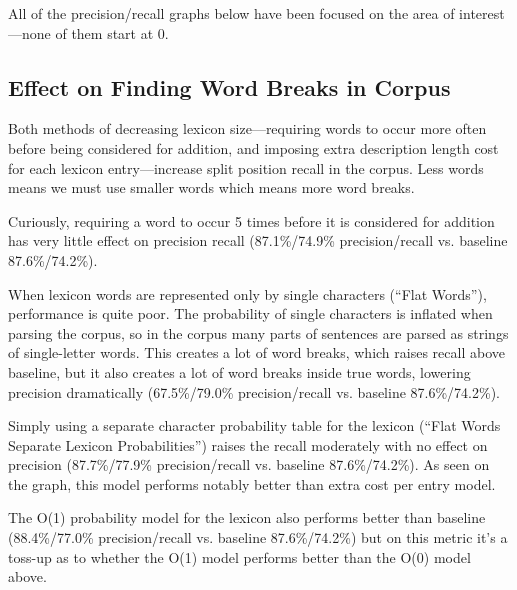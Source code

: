 \documentclass[11pt, oneside, fleqn]{article}
\begin{document}
  All of the precision/recall graphs below have been focused on the area of interest---none of them start at 0.
  
  \subsection{Effect on Finding Word Breaks in Corpus}
  
  Both methods of decreasing lexicon size---requiring words to occur more often before being considered for addition, and imposing extra description length cost for each lexicon entry---increase split position recall in the corpus. Less words means we must use smaller words which means more word breaks.
 
 	Curiously, requiring a word to occur 5 times before it is considered for addition has very little effect on precision recall (87.1\%/74.9\% precision/recall vs. baseline 87.6\%/74.2\%).

	When lexicon words are represented only by single characters (``Flat Words''), performance is quite poor. The probability of single characters is inflated when parsing the corpus, so in the corpus many parts of sentences are parsed as strings of single-letter words. This creates a lot of word breaks, which raises recall above baseline, but it also creates a lot of word breaks inside true words, lowering precision dramatically (67.5\%/79.0\% precision/recall vs. baseline 87.6\%/74.2\%).

	Simply using a separate character probability table for the lexicon (``Flat Words Separate Lexicon Probabilities'') raises the recall moderately with no effect on precision (87.7\%/77.9\% precision/recall vs. baseline 87.6\%/74.2\%). As seen on the graph, this model performs notably better than extra cost per entry model.

	The O(1) probability model for the lexicon also performs better than baseline (88.4\%/77.0\% precision/recall vs. baseline 87.6\%/74.2\%) but on this metric it's a toss-up as to whether the O(1) model performs better than the O(0) model above.
\end{document}

